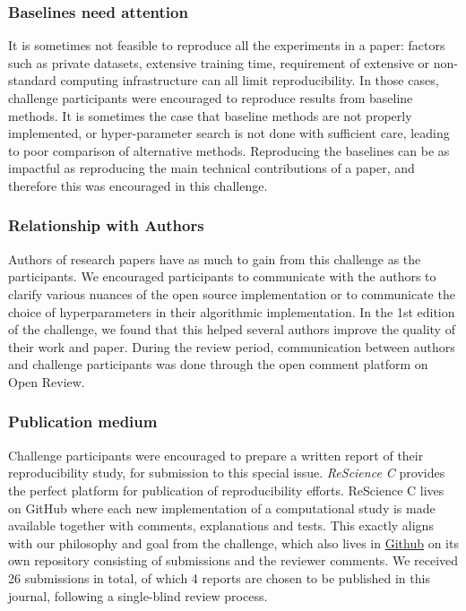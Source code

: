 \subsubsection{Baselines need attention} 

It is sometimes not feasible to reproduce all the experiments in a paper: factors such as private datasets, extensive training time, requirement of extensive or non-standard computing infrastructure can all limit reproducibility. In those cases, challenge participants were encouraged to reproduce results from baseline methods.  It is sometimes the case that baseline methods are not properly implemented, or hyper-parameter search is not done with sufficient care, leading to poor comparison of alternative methods. Reproducing the baselines can be as impactful as reproducing the main technical contributions of a paper, and therefore this was encouraged in this challenge.

\subsubsection{Relationship with Authors} 

Authors of research papers have as much to gain from this challenge as the participants. We encouraged participants to communicate with the authors to clarify various nuances of the open source implementation or to communicate the choice of hyperparameters in their algorithmic implementation.  In the 1st edition of the challenge, we found that this helped several authors improve the quality of their work and paper.  During the review period, communication between authors and challenge participants was done through the open comment platform on Open Review.

\subsubsection{Publication medium}

Challenge participants were encouraged to prepare a written report of their reproducibility study, for submission to this special issue.  \textit{ReScience C} provides the perfect platform for publication of reproducibility efforts. ReScience C lives on GitHub where each new implementation of a computational study is made available together with comments, explanations and tests. This exactly aligns with our philosophy and goal from the challenge, which also lives in \href{https://github.com/reproducibility-challenge/iclr_2019/}{Github} on its own repository consisting of submissions and the reviewer comments.   We received 26 submissions in total, of which 4 reports are chosen to be published in this journal, following a single-blind review process.

